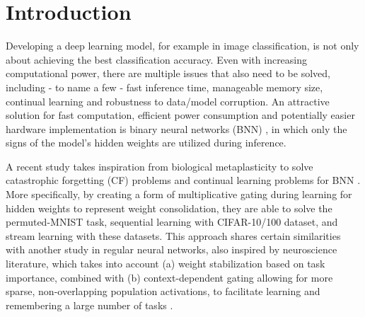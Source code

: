 \documentclass[manuscript,screen,review]{acmart}
\begin{document}



\maketitle

\section{Introduction}
Developing a deep learning model, for example in image classification, is not only about achieving the best classification accuracy. Even with increasing computational power, there are multiple issues that also need to be solved, including - to name a few - fast inference time, manageable memory size, continual learning and robustness to data/model corruption. An attractive solution for fast computation, efficient power consumption and potentially easier hardware implementation is binary neural networks (BNN) \cite{DBLP:journals/corr/CourbariauxB16}, in which only the signs of the model’s hidden weights are utilized during inference. 

A recent study takes inspiration from biological metaplasticity to solve catastrophic forgetting (CF) problems and continual learning problems for BNN \cite{Laborieux_Ernoult_Hirtzlin_Querlioz_2021}. More specifically, by creating a form of multiplicative gating during learning for hidden weights to represent weight consolidation, they are able to solve the permuted-MNIST task, sequential learning with CIFAR-10/100 dataset, and stream learning with these datasets. This approach shares certain similarities with another study in regular neural networks, also inspired by neuroscience literature, which takes into account (a) weight stabilization based on task importance, combined with (b) context-dependent gating allowing for more sparse, non-overlapping population activations, to facilitate learning and remembering a large number of tasks \cite{Masse_2018}. 
\end{document}

